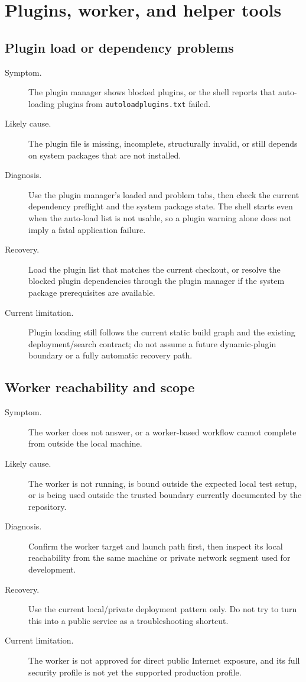 \section{Plugins, worker, and helper tools}
\label{sec:troubleshooting-plugins-worker-tools}

\subsection{Plugin load or dependency problems}
\label{subsec:troubleshooting-plugins}

\begin{description}
\item[Symptom.] The plugin manager shows blocked plugins, or the shell reports
that auto-loading plugins from \texttt{autoloadplugins.txt} failed.
\item[Likely cause.] The plugin file is missing, incomplete, structurally
invalid, or still depends on system packages that are not installed.
\item[Diagnosis.] Use the plugin manager's loaded and problem tabs, then check
the current dependency preflight and the system package state. The shell
starts even when the auto-load list is not usable, so a plugin warning alone
does not imply a fatal application failure.
\item[Recovery.] Load the plugin list that matches the current checkout, or
resolve the blocked plugin dependencies through the plugin manager if the
system package prerequisites are available.
\item[Current limitation.] Plugin loading still follows the current static
build graph and the existing deployment/search contract; do not assume a future
dynamic-plugin boundary or a fully automatic recovery path.
\end{description}

\subsection{Worker reachability and scope}
\label{subsec:troubleshooting-worker}

\begin{description}
\item[Symptom.] The worker does not answer, or a worker-based workflow cannot
complete from outside the local machine.
\item[Likely cause.] The worker is not running, is bound outside the expected
local test setup, or is being used outside the trusted boundary currently
documented by the repository.
\item[Diagnosis.] Confirm the worker target and launch path first, then inspect
its local reachability from the same machine or private network segment used
for development.
\item[Recovery.] Use the current local/private deployment pattern only. Do not
try to turn this into a public service as a troubleshooting shortcut.
\item[Current limitation.] The worker is not approved for direct public
Internet exposure, and its full security profile is not yet the supported
production profile.
\end{description}

